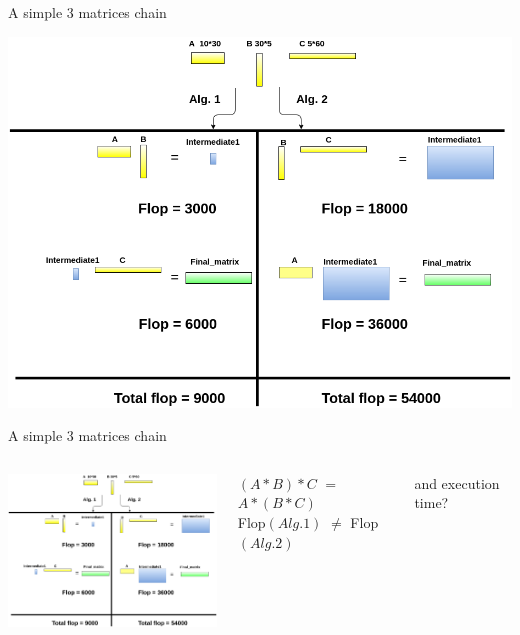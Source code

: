 \documentclass[10pts]{beamer}
\begin{document}
	   	\begin{frame}{A simple 3 matrices chain}
	   		 \begin{center}
	   			\includegraphics[scale =0.3]{3mat_1_full.png}
	   		 \end{center}
	   	\end{frame}
		
	   	\begin{frame}{A simple 3 matrices chain}
	   	     \begin{columns}
		   	     \begin{center}
	   	     		\includegraphics[width=70mm,scale =0.3]{3mat_1_full.png}
		   	     \end{center}
	   	     
		   		 $(A*B)*C$  $ =$ $A*(B*C)$\\
		   		 Flop$(Alg. 1)$ $\neq$ Flop$(Alg. 2)$\\
		   		 \begin{center}
		   		  and  execution time?
		   		 \end{center}
		   	\end{columns}	
	   	\end{frame} 
	   	
\end{document}
